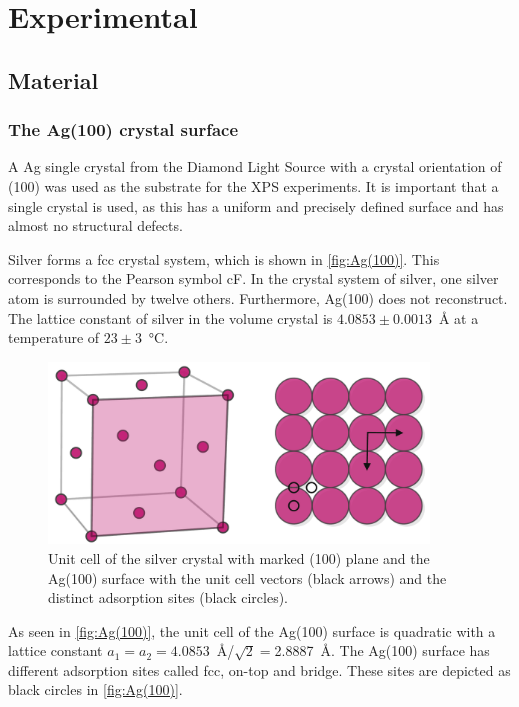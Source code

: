 \chapter{Experimental}
\section{Material}

\subsection{The Ag(100) crystal surface}
A \acf{Ag} single crystal from the Diamond Light Source with a crystal orientation of (100) was used as the substrate for the \ac{XPS} experiments. It is important that a single crystal is used, as this has a uniform and precisely defined surface and has almost no structural defects.

Silver forms a \ac{fcc} crystal system, which is shown in \autoref{fig:Ag(100)}. This corresponds to the Pearson symbol cF. In the crystal system of silver, one silver atom is surrounded by twelve others. Furthermore, Ag(100) does not reconstruct. The lattice constant of silver in the volume crystal is $4.0853\pm0.0013$~\si{\angstrom} at a temperature of $23\pm3$~\si{\celsius}\autocite{Liu1973}.

\begin{figure}[H]
	\centering
	\includegraphics[width=0.9\textwidth]{images/Ag(100).pdf}
	\caption{Unit cell of the silver crystal with marked (100) plane and the Ag(100) surface with the unit cell vectors (black arrows) and the distinct adsorption sites (black circles).}
	\label{fig:Ag(100)}
\end{figure}

As seen in \autoref{fig:Ag(100)}, the unit cell of the Ag(100) surface is quadratic with a lattice constant $a_1=a_2=4.0853$~\si{\angstrom}/$\sqrt{2}=$2.8887~\si{\angstrom}. The Ag(100) surface has different adsorption sites called fcc, on-top and bridge. These sites are depicted as black circles in \autoref{fig:Ag(100)}.

